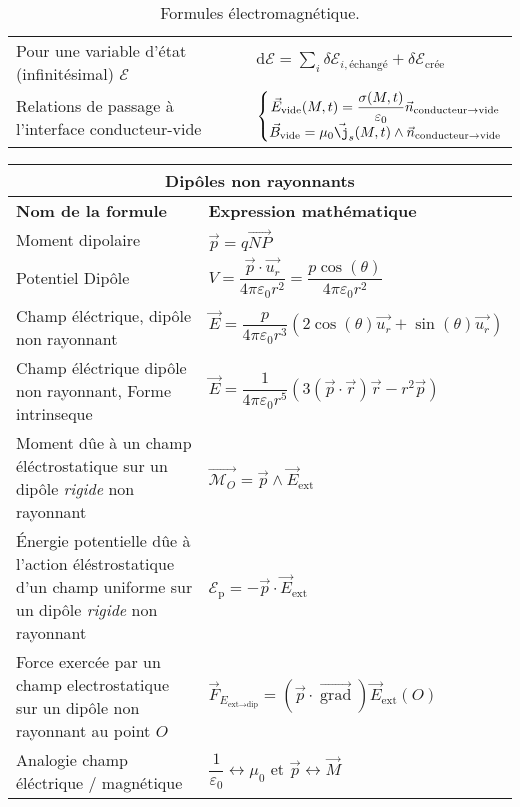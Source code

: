 \documentclass[10pt,a4paper,titlepage,portrait]{article}
\newcommand{\grad}
{
    \vec{\operatorname{grad}}
}
\renewcommand{\arraystretch}{2}
\begin{document}
\begin{center}
\begin{table}[H]
\begin{tabular}{@{}p{9cm}p{10cm}@{}}
    Pour une variable d'état (infinitésimal) $\mathcal{E}$ & $\displaystyle \text{d} \mathcal{E} = \sum\limits_{i} \delta\mathcal{E}_{i, \text{échangé}} + \delta \mathcal{E}_{\text{crée}}$ \\ 
    Relations de passage à l'interface conducteur-vide & $\left\{\begin{matrix} \vec{E}_{\text{vide}}(M,t) = \dfrac{\sigma(M,t)}{\varepsilon_0}\vec{n}_{\text{conducteur} \to \text{vide}} \\ \vec{B}_{\text{vide}} = \mu_0 \vec{\j}_s(M,t)\wedge \vec{n}_{\text{conducteur} \to \text{vide}}\end{matrix}\right.$ \\
    \bottomrule
\end{tabular}
\caption{Formules électromagnétique.}
\label{tab:electromag}
\end{table}

\begin{table}[H]
    \centering
    \renewcommand{\arraystretch}{1.5} %
    \setlength{\tabcolsep}{8pt} %
    \begin{tabular}{@{}p{9cm}p{10cm}@{}}
        \toprule
        \multicolumn{2}{c}{\textbf{Dipôles non rayonnants}} \\
        \midrule
        \textbf{Nom de la formule} & \textbf{Expression mathématique} \\
        \midrule
        Moment dipolaire & $\vec p = q \vec{NP}$ \\
        Potentiel Dipôle & $V = \dfrac{\vec{p} \cdot \vec{u_r}}{4\pi \varepsilon_0 r^2} = \dfrac{p\cos(\theta)}{4\pi \varepsilon_0 r^2}$ \\ 
        Champ éléctrique, dipôle non rayonnant & $\vec{E} = \dfrac{p}{4\pi \varepsilon_0 r^3}(2\cos(\theta) \vec{u_r} + \sin(\theta) \vec{u_r})$ \\ 
        Champ éléctrique dipôle non rayonnant, Forme intrinseque & $\vec{E} = \dfrac{1}{4\pi\varepsilon_0 r^5}(3(\vec{p} \cdot \vec{r})\vec{r} - r^2\vec{p})$ \\ 
        Moment dûe à un champ éléctrostatique sur un dipôle \textit{rigide} non rayonnant & $\vec{\mathcal{M}_O}=\vec{p}\wedge \vec{E}_{\text{ext}}$ \\
        Énergie potentielle dûe à l'action éléstrostatique d'un champ uniforme sur un dipôle \textit{rigide} non rayonnant & $\mathcal{E}_{\text{p}} = -\vec{p}\cdot\vec{E}_{\text{ext}}$\\
        Force exercée par un champ electrostatique sur un dipôle non rayonnant au point $O$ & $\vec{F}_{E_{\text{ext}\longrightarrow\text{dip}}} = \left(\vec{p}\cdot\grad\right)\vec{E}_{\text{ext}}(O)$\\
        Analogie champ éléctrique $/$ magnétique & $\dfrac{1}{\varepsilon_0} \longleftrightarrow \mu_0$ et $\vec{p} \longleftrightarrow \vec{M}$ \\
                

\end{tabular}
\end{table}
\end{center}
\end{document}
